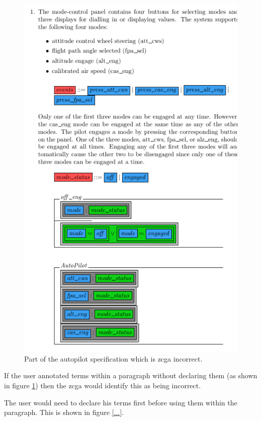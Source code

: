 \begin{figure}[H]
\begin{minipage}{0.45\textwidth}
     \includegraphics[width=\linewidth]{Figures/fullexample/semiform1a.png}
     \end{minipage}
     \caption{Part of the autopilot specification which is \gls{zcga} incorrect.\label{fig:sfzcgaincorrect}}
     \end{figure}

If the user annotated terms within a paragraph without declaring them (as shown
in figure \ref{fig:sfzcgaincorrect}) then the \gls{zcga} would identify this as being
incorrect.

The user would need to declare his terms first before using them within the
paragraph. This is shown in figure \ref{...}.

